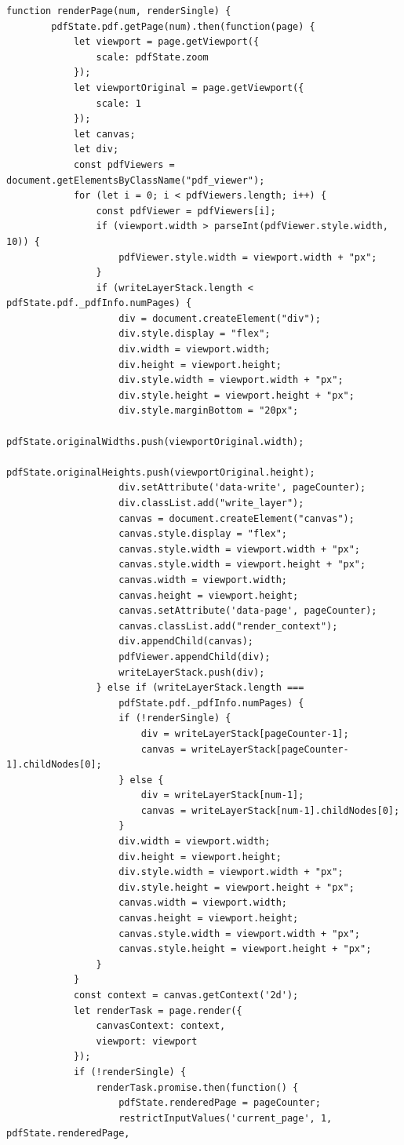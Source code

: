 \begin{lstlisting}[style=ES6, caption={Renderfunktion}, label=code:render]
	function renderPage(num, renderSingle) {
		pdfState.pdf.getPage(num).then(function(page) {
			let viewport = page.getViewport({
				scale: pdfState.zoom
			});
			let viewportOriginal = page.getViewport({
				scale: 1
			});
			let canvas;
			let div;
			const pdfViewers = document.getElementsByClassName("pdf_viewer");
			for (let i = 0; i < pdfViewers.length; i++) {
				const pdfViewer = pdfViewers[i];
				if (viewport.width > parseInt(pdfViewer.style.width, 10)) {
					pdfViewer.style.width = viewport.width + "px";
				}
				if (writeLayerStack.length < pdfState.pdf._pdfInfo.numPages) {
					div = document.createElement("div");
					div.style.display = "flex";
					div.width = viewport.width;
					div.height = viewport.height;
					div.style.width = viewport.width + "px";
					div.style.height = viewport.height + "px";
					div.style.marginBottom = "20px";
					pdfState.originalWidths.push(viewportOriginal.width);
					pdfState.originalHeights.push(viewportOriginal.height);
					div.setAttribute('data-write', pageCounter);
					div.classList.add("write_layer");
					canvas = document.createElement("canvas");
					canvas.style.display = "flex";
					canvas.style.width = viewport.width + "px";
					canvas.style.width = viewport.height + "px";
					canvas.width = viewport.width;
					canvas.height = viewport.height;
					canvas.setAttribute('data-page', pageCounter);
					canvas.classList.add("render_context");
					div.appendChild(canvas);
					pdfViewer.appendChild(div);
					writeLayerStack.push(div);
				} else if (writeLayerStack.length === 
					pdfState.pdf._pdfInfo.numPages) {
					if (!renderSingle) {
						div = writeLayerStack[pageCounter-1];
						canvas = writeLayerStack[pageCounter-1].childNodes[0];
					} else {
						div = writeLayerStack[num-1];
						canvas = writeLayerStack[num-1].childNodes[0];
					}
					div.width = viewport.width;
					div.height = viewport.height;
					div.style.width = viewport.width + "px";
					div.style.height = viewport.height + "px";
					canvas.width = viewport.width;
					canvas.height = viewport.height;
					canvas.style.width = viewport.width + "px";
					canvas.style.height = viewport.height + "px";
				}
			}
			const context = canvas.getContext('2d');
			let renderTask = page.render({
				canvasContext: context,
				viewport: viewport
			});
			if (!renderSingle) {
				renderTask.promise.then(function() {
					pdfState.renderedPage = pageCounter;
					restrictInputValues('current_page', 1, pdfState.renderedPage, 

\end{lstlisting}
